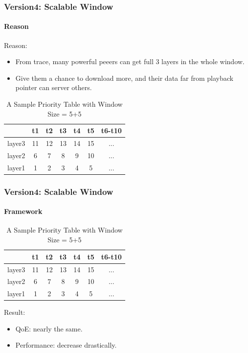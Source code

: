 \documentclass[14pt]{beamer}
\begin{document}
\begin{frame}
\frametitle{Version4: Scalable Window}
\framesubtitle{Reason}
Reason:
\begin{itemize}
	\item From trace, many powerful peeers can get full 3 layers
	in the whole window. 
	\item Give them a chance to download more, and their data
	far from playback pointer can server others. 
\end{itemize}
\begin{table}
\caption{A Sample Priority Table with Window Size = 5+5}
	\begin{tabular}{|c|ccccc|c|}
	\hline
	 & t1 & t2 & t3 & t4 & t5 & t6-t10 \\
	 \hline
	layer3 & 11 & 12 & 13 & 14 & 15 & ...\\
	layer2 & 6 & 7 & 8 & 9 & 10 & ... \\
	layer1 & 1 & 2 & 3 & 4 & 5  & ...\\
	\hline
	\end{tabular}
\end{table}
\end{frame}

\begin{frame}
\frametitle{Version4: Scalable Window}
\framesubtitle{Framework}
\begin{table}
\caption{A Sample Priority Table with Window Size = 5+5}
	\begin{tabular}{|c|ccccc|c|}
	\hline
	 & t1 & t2 & t3 & t4 & t5 & t6-t10 \\
	 \hline
	layer3 & 11 & 12 & 13 & 14 & 15 & ...\\
	layer2 & 6 & 7 & 8 & 9 & 10 & ... \\
	layer1 & 1 & 2 & 3 & 4 & 5  & ...\\
	\hline
	\end{tabular}
\end{table}
Result:
\begin{itemize}
	\item QoE: nearly the same. 
	\item Performance: decrease drastically. 
\end{itemize}
\end{frame}
\end{document}
